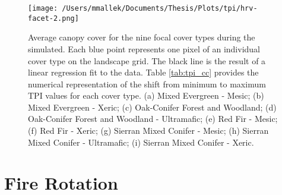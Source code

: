 \begin{figure}[!htbp]
\centering
\texttt{[image: /Users/mmallek/Documents/Thesis/Plots/tpi/hrv-facet-2.png]}
\caption{Average canopy cover for the nine focal cover types during the simulated. Each blue point represents one pixel of an individual cover type on the landscape grid. The black line is the result of a linear regression fit to the data. Table \ref{tab:tpi_cc} provides the numerical representation of the shift from minimum to maximum TPI values for each cover type. (a) Mixed Evergreen - Mesic; (b) Mixed Evergreen - Xeric; (c) Oak-Conifer Forest and Woodland; (d) Oak-Conifer Forest and Woodland - Ultramafic; (e) Red Fir - Mesic; (f) Red Fir - Xeric; (g) Sierran Mixed Conifer - Mesic; (h) Sierran Mixed Conifer - Ultramafic; (i) Sierran Mixed Conifer - Xeric.} 
\label{fig:tpi_cc}
\end{figure}

\clearpage



\section{Fire Rotation}

